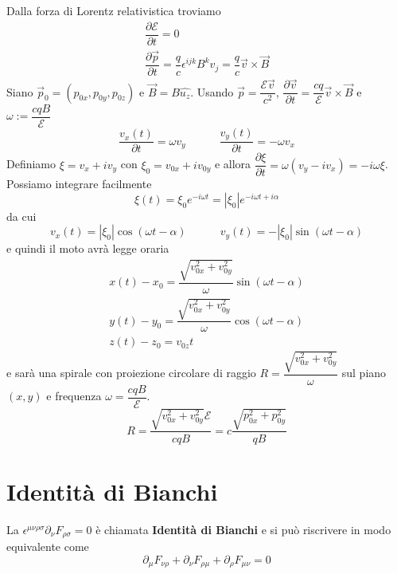 \documentclass[12pt,a4paper,titlepage, twoside, openright]{book}
\numberwithin{equation}{chapter}
\begin{document}
Dalla forza di Lorentz relativistica troviamo
\begin{gather}
\dfrac{\partial \mathcal{E}}{\partial t}=0 \\
\dfrac{\partial \vec{p}}{\partial t}=\dfrac{q}{c}\epsilon^{ijk}B^k v_j=\dfrac{q}{c}\vec{v}\times \vec{B}
\end{gather}
Siano $\vec{p}_0=(p_{0x},p_{0y},p_{0z})$ e $\vec{B}=B\hat{u_z}$.
Usando $\vec{p}=\dfrac{\mathcal{E}\vec{v}}{c^2}$, $\dfrac{\partial \vec{v}}{\partial t}=\dfrac{cq}{\mathcal{E}}\vec{v}\times \vec{B}$ e $\omega:=\dfrac{cqB}{\mathcal{E}}$
\[
\dfrac{v_x(t)}{\partial t}=\omega v_y \qquad \quad
\dfrac{v_y(t)}{\partial t}=-\omega v_x 
\]
Definiamo $\xi=v_x+iv_y$ con $\xi_0=v_{0x}+iv_{0y}$ e allora $\dfrac{\partial \xi}{\partial t}=\omega(v_y-iv_x)=-i\omega\xi$. Possiamo integrare facilmente \[\xi(t)=\xi_0 e^{-i\omega t}=|\xi_0|e^{-i\omega t +i\alpha}\]
da cui 
\[
v_x(t)=|\xi_0|\cos{(\omega t-\alpha)}\qquad\quad
v_y(t)=-|\xi_0|\sin{(\omega t-\alpha)}
\]
e quindi il moto avrà legge oraria
\begin{gather}
x(t)-x_0=\dfrac{\sqrt{v_{0x}^2+v_{0y}^2}}{\omega}\sin{(\omega t-\alpha)}\\
y(t)-y_0=\dfrac{\sqrt{v_{0x}^2+v_{0y}^2}}{\omega}\cos{(\omega t-\alpha)}\\
z(t)-z_0=v_{0z}t
\end{gather}
e sarà una spirale con proiezione circolare di raggio $R=\dfrac{\sqrt{v_{0x}^2+v_{0y}^2}}{\omega}$ sul piano $(x,y)$  e frequenza $\omega=\dfrac{cqB}{\mathcal{E}}$.
\begin{equation}
R=\dfrac{\sqrt{v_{0x}^2+v_{0y}^2}\mathcal{E}}{cqB}=c\dfrac{\sqrt{p_{0x}^2+p_{0y}^2}}{qB}
\end{equation}
\section{Identità di Bianchi}


La $\epsilon^{\mu\nu\rho\sigma}\partial_\nu F_{\rho\sigma}=0$ è chiamata \textbf{Identità di Bianchi} e si può riscrivere in modo equivalente come
\begin{equation}\label{eqIdentità Bianchi 2}
\partial_\mu F_{\nu\rho} + \partial_\nu F_{\rho\mu} + \partial_\rho F_{\mu\nu}=0
\end{equation}
\end{document}
